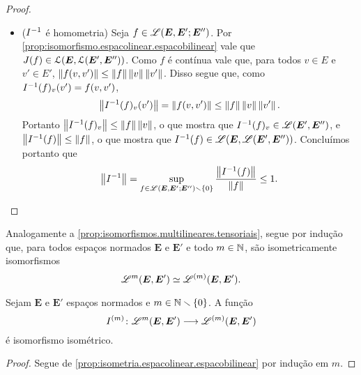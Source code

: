 \begin{proof}
\begin{itemize}
	\item ($I^{-1}$ é homometria) Seja $f \in \mathscr{L}(\bm E,\bm E';\bm E'')$. Por \ref{prop:isomorfismo.espacolinear.espacobilinear} vale que $J(f) \in \mathcal{L}(\bm E,\mathcal{L}(\bm E',\bm E''))$. Como $f$ é contínua vale que, para todos $v \in E$ e $v' \in E'$, $\left\Vert{f(v,v')}\right\Vert \leq \left\Vert{f}\right\Vert\left\Vert{v}\right\Vert\left\Vert{v'}\right\Vert$. Disso segue que, como $I^{-1}(f)_v(v') = f(v,v')$,
		\begin{equation*}
		\left\Vert{I^{-1}(f)_v(v')}\right\Vert = \left\Vert{f(v,v')}\right\Vert \leq \left\Vert{f}\right\Vert\left\Vert{v}\right\Vert\left\Vert{v'}\right\Vert.
		\end{equation*}
	Portanto $\left\Vert{I^{-1}(f)_v}\right\Vert \leq \left\Vert{f}\right\Vert\left\Vert{v}\right\Vert$, o que mostra que $I^{-1}(f)_v \in \mathscr{L}(\bm E',\bm E'')$, e $\left\Vert{I^{-1}(f)}\right\Vert \leq \left\Vert{f}\right\Vert$, o que mostra que $I^{-1}(f) \in \mathscr{L}(\bm E, \mathscr{L}(\bm E',\bm E''))$. Concluímos portanto que
		\begin{equation*}
		\left\Vert{I^{-1}}\right\Vert = \sup_{f \in \mathscr{L}(\bm E,\bm E';\bm E'') \smallsetminus \{0\}} \frac{\left\Vert{I^{-1}(f)}\right\Vert}{\left\Vert{f}\right\Vert} \leq 1.
		\qedhere
		\end{equation*}
\end{itemize}
\end{proof}

Analogamente a \ref{prop:isomorfismos.multilineares.tensoriais}, segue por indução que, para todos espaços normados $\bm E$ e $\bm E'$ e todo $m \in \mathbb{N}$, são isometricamente isomorfismos
	\begin{equation*}
	\toplin^m(\bm E, \bm E')\simeq \toplin^{(m)}(\bm E,\bm E').%
	\end{equation*}

\begin{proposition}
\label{prop:isometria.estratificada.multilinear}
Sejam $\bm E$ e $\bm E'$ espaços normados e $m \in \mathbb{N} \smallsetminus \{0\}$. A função
	\begin{equation*}
	I^{(m)}\colon \allowbreak \mathscr{L}^m(\bm E, \bm E') \longrightarrow \mathscr{L}^{(m)}(\bm E, \bm E')
	\end{equation*}
é isomorfismo isométrico.
\end{proposition}
\begin{proof}
Segue de \ref{prop:isometria.espacolinear.espacobilinear} por indução em $m$.
\end{proof}

